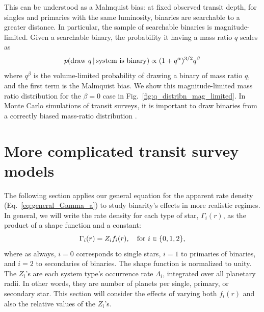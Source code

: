 \documentclass[12pt,modern]{aastex61}
\begin{document}
This can be understood as a Malmquist bias: at fixed observed transit 
depth, for singles and primaries with the same luminosity, binaries are 
searchable to a greater distance.
In particular, the sample of searchable binaries is magnitude-limited.
Given a searchable binary, the probability it having a mass ratio $q$ 
scales as
\begin{equation}
p({\rm draw\ }q\,|\,{\rm system\ is\ binary}) \propto 
(1+q^\alpha)^{3/2} q^\beta 
\label{eq:Malmquist_bias}
\end{equation}
where $q^\beta$ is the volume-limited probability of drawing a binary of mass 
ratio $q$, and the first term is the Malmquist bias.
We show this magnitude-limited mass ratio distribution for the $\beta=0$ case 
in Fig.~\ref{fig:q_distribn_mag_limited}.
In Monte Carlo simulations of transit surveys, it is 
important to draw binaries from a correctly biased mass-ratio distribution 
\citep[\textit{e.g.},][]{bakos_hatsouth:_2013,sullivan_transiting_2015,
    gunther_new_2017}.



%

\section{More complicated transit survey models}
\label{sec:more_complicated}
The following section applies our general equation for the apparent rate 
density (Eq.~\ref{eq:general_Gamma_a}) to study binarity's effects in more 
realistic regimes.
In general, we will write the rate density for each type of star, 
$\Gamma_i(r)$, as the product of a shape function and a constant:
\begin{equation}
\Gamma_i(r) = Z_i f_i(r), \quad {\rm for\ }i\in\{0,1,2\},
\end{equation}
where as always, $i=0$ corresponds to single stars, $i=1$ to primaries of 
binaries, and $i=2$ to secondaries of binaries.
The shape function is normalized to unity.
The $Z_i$'s are each system type's occurrence rate $\Lambda_i$, integrated 
over all planetary radii. In other words, they are number of planets per 
single, primary, or secondary star.
This section will consider the effects of varying both $f_i(r)$ and also the
relative values of the $Z_i$'s.

\end{document}
